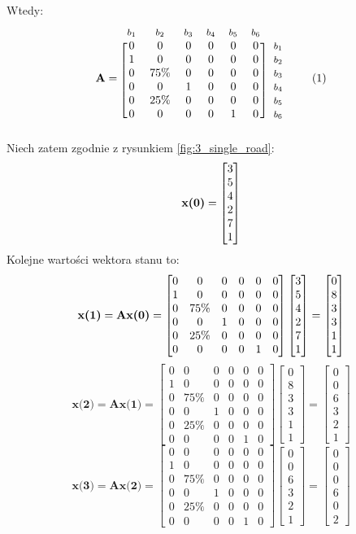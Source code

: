 \documentclass[12pt]{book}
\theoremstyle{plain}
\newcommand\addtag{\refstepcounter{equation}
\renewcommand{\labelenumii}{\theenumii}
\renewcommand{\theenumii}{\theenumi.\arabic{enumii}.}
\tag{\theequation}}
\begin{document}
Wtedy:
\def \A{
\begin{bmatrix}
	0 & 0    & 0 & 0 & 0 & 0 \\
	1 & 0    & 0 & 0 & 0 & 0 \\
	0 & 75\% & 0 & 0 & 0 & 0 \\
	0 & 0    & 1 & 0 & 0 & 0 \\
	0 & 25\% & 0 & 0 & 0 & 0 \\
	0 & 0    & 0 & 0 & 1 & 0 
\end{bmatrix}
}
\begin{equation*}
\textbf{A}=
\begin{blockarray}{*{6}{c} l}
\begin{block}{*{6}{>{$\footnotesize}c<{$}} l}
$b_1$ & $b_2$ & $b_3$ & $b_4$ & $b_5$ & $b_6$ \\
\end{block}
\begin{block}{[*{6}{c}]>{$\footnotesize}l<{$}}
0 & 0 & 0 & 0 & 0 & 0 & $b_1$ \\
1 & 0 & 0 & 0 & 0 & 0 & $b_2$ \\
0 & 75\% & 0 & 0 & 0 & 0 & $b_3$ \\
0 & 0 & 1 & 0 & 0 & 0 & $b_4$ \\
0 & 25\% & 0 & 0 & 0 & 0 & $b_5$ \\
0 & 0 & 0 & 0 & 1 & 0 & $b_6$ \\
\end{block}
\end{blockarray} \addtag
\end{equation*}
Niech zatem zgodnie z rysunkiem \ref{fig:3_single_road}:
\[\textbf{x(0)}=\begin{bmatrix} 3 \\ 5 \\ 4 \\ 2 \\ 7 \\ 1 \end{bmatrix} \]
Kolejne wartości wektora stanu to:
\def \xI{\begin{bmatrix}
	0 \\ 8 \\ 3 \\ 3 \\ 1 \\ 1
\end{bmatrix}}
\def \xII{\begin{bmatrix}
		0 \\ 0 \\ 6 \\ 3 \\ 2 \\ 1
	\end{bmatrix}}
\def \xIII{\begin{bmatrix}
		0 \\ 0 \\ 0 \\ 6 \\ 0 \\ 2
\end{bmatrix}}
\[
\textbf{x(1)}=\textbf{Ax(0)}=\A \xzero = \xI
\]
\[
\textbf{x(2)}=\textbf{Ax(1)}=\A \xI = \xII
\]
\[
\textbf{x(3)}=\textbf{Ax(2)}=\A \xII = \xIII
\]
\end{document}
